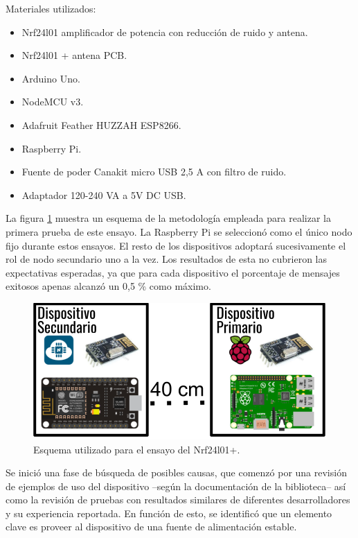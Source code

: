 Materiales utilizados:
\begin{itemize}
\item  Nrf24l01 amplificador de potencia con reducción de ruido y antena.
\item  Nrf24l01 + antena PCB.
\item  Arduino Uno.   
\item  NodeMCU v3.
\item  Adafruit Feather HUZZAH ESP8266.
\item  Raspberry Pi.
\item  Fuente de poder Canakit micro USB 2,5 A con filtro de ruido.
\item Adaptador 120-240 VA a 5V DC USB.
\end{itemize}

La figura \ref{fig:figura_a} muestra un esquema de la metodología empleada para realizar la primera prueba de este ensayo. La Raspberry Pi se seleccionó como el único nodo fijo durante estos ensayos. El resto de los dispositivos adoptará sucesivamente el rol de nodo secundario uno a la vez. Los resultados de esta no cubrieron las expectativas esperadas, ya que para cada dispositivo el porcentaje de mensajes exitosos apenas alcanzó un 0,5 \% como máximo.

\vspace{5mm} %

\begin{figure}[ht]
	\centering
	\includegraphics[scale=.45]{./Figures/Capitulo4/Figura_A.png}
	\caption{Esquema utilizado para el ensayo del Nrf24l01+.}
	\label{fig:figura_a}
\end{figure}

Se inició una fase de búsqueda de posibles causas, que comenzó por una revisión de ejemplos de uso del dispositivo --según la documentación de la biblioteca-- así como la revisión de pruebas con resultados similares de diferentes desarrolladores y su experiencia reportada. En función de esto, se identificó que un elemento clave es proveer al dispositivo de una fuente de alimentación estable.

